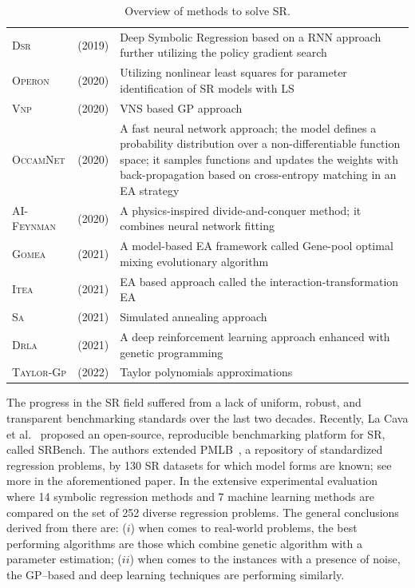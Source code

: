 \documentclass[a4paper,12pt]{elsarticle}
\begin{document}
\begin{table}[!ht]
{\begin{tabularx}{550pt}{l  l  X}
				\textsc{Dsr}  & \cite{petersen2019deep} (2019) & Deep Symbolic Regression based on a RNN approach further utilizing the policy gradient search \\
				\textsc{Operon} & \cite{kommenda2020parameter} (2020) &  Utilizing nonlinear least squares for parameter identification of SR models with LS \\
				\textsc{Vnp}    & \cite{elleuch2020variable} (2020) & VNS based GP approach \\
				\textsc{OccamNet} & \cite{costa2020fast} (2020) &   A fast neural network approach; the model defines a probability distribution over a non-differentiable function space; it samples functions and updates the weights with back-propagation  based on cross-entropy matching in an EA strategy	 \\
				
				\textsc{AI-Feynman} & \cite{udrescu2020ai} (2020) & A physics-inspired divide-and-conquer method; it  combines neural network fitting \\
				\textsc{Gomea}  & \cite{virgolin2021improving} (2021)    & A model-based
				EA framework called Gene-pool optimal mixing evolutionary algorithm \\
				\textsc{Itea} & \cite{de2021interaction} (2021)   & EA based approach called the interaction-transformation EA   \\
				\textsc{Sa} & \cite{kantor2021simulated} (2021) &  Simulated annealing approach \\
				
				\textsc{Drla} & \cite{mundhenk2021symbolic} (2021)  &    A deep reinforcement learning approach enhanced with genetic programming \\
				\textsc{Taylor-Gp} &  \cite{he2022taylor} (2022)  &  Taylor polynomials approximations  \\ \hline
				
				
		\end{tabularx} }
		\caption{Overview of methods to solve SR.}
		\label{tab:gp-based}
	\end{table}
	
	
   The progress in the SR field suffered from a lack of uniform, robust, and transparent
	benchmarking standards over the last two decades. Recently, La Cava et al.~\cite{la2021contemporary} proposed an
	open-source, reproducible benchmarking platform for SR, called SRBench. The authors extended  PMLB~\cite{olson2017pmlb},  a repository of standardized regression problems, by 130 SR datasets for which model forms are known; see more in the aforementioned paper. In the extensive experimental evaluation  where 14
	symbolic regression methods and 7 machine learning methods are compared on the set of 252 diverse regression problems. The general conclusions derived from there are: ($i$) when comes to real-world problems, the best performing algorithms are those which combine genetic algorithm with a parameter estimation; ($ii$) when comes to the instances with a presence of noise, the GP--based and deep learning techniques are performing similarly.  
	
\end{document}
